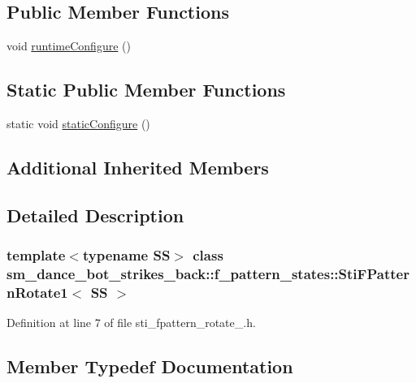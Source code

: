 \subsection*{Public Member Functions}
\begin{DoxyCompactItemize}
\item 
void \hyperlink{structsm__dance__bot__strikes__back_1_1f__pattern__states_1_1StiFPatternRotate1_a1d27a8c26bdd4a05e0644a021cc23249}{runtime\+Configure} ()
\end{DoxyCompactItemize}
\subsection*{Static Public Member Functions}
\begin{DoxyCompactItemize}
\item 
static void \hyperlink{structsm__dance__bot__strikes__back_1_1f__pattern__states_1_1StiFPatternRotate1_a1213396f19309669ac31c949446d4421}{static\+Configure} ()
\end{DoxyCompactItemize}
\subsection*{Additional Inherited Members}


\subsection{Detailed Description}
\subsubsection*{template$<$typename SS$>$\newline
class sm\+\_\+dance\+\_\+bot\+\_\+strikes\+\_\+back\+::f\+\_\+pattern\+\_\+states\+::\+Sti\+F\+Pattern\+Rotate1$<$ S\+S $>$}



Definition at line 7 of file sti\+\_\+fpattern\+\_\+rotate\+\_.\+h.



\subsection{Member Typedef Documentation}
\mbox{\label{structsm__dance__bot__strikes__back_1_1f__pattern__states_1_1StiFPatternRotate1_aba05d27680e46c9e1c82162fef32ad32}} 
